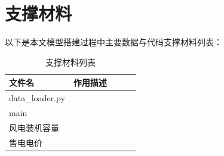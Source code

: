 \section{支撑材料}

以下是本文模型搭建过程中主要数据与代码支撑材料列表：
\begin{table}[H]
\centering
\caption{支撑材料列表}
\renewcommand{\arraystretch}{0.8}  %
\begin{tabular}{lcccc}
\toprule
文件名 & 作用描述\\
\midrule
data_loader.py &  \\
main & \\
风电装机容量 &  \\
售电电价 &  \\
\bottomrule
\end{tabular}
\end{table}